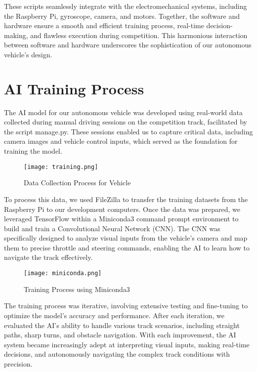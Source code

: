 \documentclass{article}
\begin{document}
\begin{multicols}{2}
These scripts seamlessly integrate with the electromechanical systems, including the Raspberry Pi, gyroscope, camera, and motors. Together, the software and hardware ensure a smooth and efficient training process, real-time decision-making, and flawless execution during competition. This harmonious interaction between software and hardware underscores the sophistication of our autonomous vehicle’s design.

\section{AI Training Process}
The AI model for our autonomous vehicle was developed using real-world data collected during manual driving sessions on the competition track, facilitated by the script manage.py. These sessions enabled us to capture critical data, including camera images and vehicle control inputs, which served as the foundation for training the model.

\begin{figure}[H]
    \centering         \texttt{[image: training.png]}
    \caption*{Data Collection Process for Vehicle}
\end{figure}

To process this data, we used FileZilla to transfer the training datasets from the Raspberry Pi to our development computers. Once the data was prepared, we leveraged TensorFlow within a Miniconda3 command prompt environment to build and train a Convolutional Neural Network (CNN). The CNN was specifically designed to analyze visual inputs from the vehicle’s camera and map them to precise throttle and steering commands, enabling the AI to learn how to navigate the track effectively.

\begin{figure}[H]
    \centering         \texttt{[image: miniconda.png]}
    \caption*{Training Process using Miniconda3}
\end{figure}

The training process was iterative, involving extensive testing and fine-tuning to optimize the model's accuracy and performance. After each iteration, we evaluated the AI's ability to handle various track scenarios, including straight paths, sharp turns, and obstacle navigation. With each improvement, the AI system became increasingly adept at interpreting visual inputs, making real-time decisions, and autonomously navigating the complex track conditions with precision.


\end{multicols}
\end{document}
